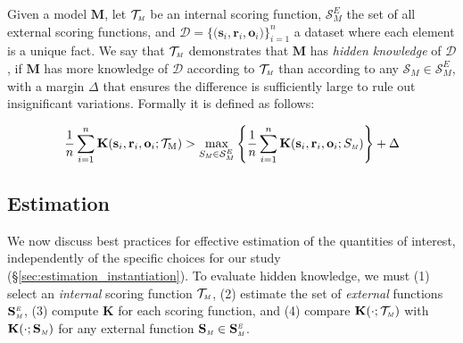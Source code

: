 \vspace{-5pt}
\begin{definition}\label{def:mistake}
\label{def:hidden_knowledge}

Given a model \( \mathbf{M} \), let \( \mathcal{T}_{\text{\tiny \emph{M}}} \) be an internal scoring function, \( \mathcal{S}_M^E \) the set of all external scoring functions, and \( \mathcal{D} = \{ \big(\mathbf{s}_i,\mathbf{r}_i,\mathbf{o}_i\big) \}_{i=1}^n \) a dataset where each element is a unique fact.
We say that \( \mathcal{T}_{\text{\tiny \emph{M}}} \) demonstrates that \( \mathbf{M} \) has \emph{hidden knowledge} of \( \mathcal{D} \), if \( \mathbf{M} \) has more knowledge of \( \mathcal{D} \) according to \( \mathcal{T}_{\text{\tiny \emph{M}}} \) than according to any \( \mathcal{S}_M \in \mathcal{S}_M^E \), with a margin \( \Delta \) that ensures the difference is sufficiently large to rule out insignificant variations. Formally it is defined as follows:



\vspace{-5pt}
\begin{equation}
\frac{1}{n} \sum_{i=1}^n \mathbf{K}(\mathbf{s}_i, \mathbf{r}_i, \mathbf{o}_i; \mathcal{T}_{\text{M}}) >
\max_{S_{\text{\tiny \emph{M}}} \in \mathcal{S}_M^E} \left\{
    \frac{1}{n} \sum_{i=1}^n \mathbf{K}(\mathbf{s}_i, \mathbf{r}_i, \mathbf{o}_i; S_{\text{\tiny \emph{M}}})
\right\} + \Delta
\label{eq:hidden_knowledge}
\end{equation}

\end{definition}


\vspace{-20pt}
\subsection{Estimation}
\label{sec:estimation}

We now discuss best practices for effective estimation of the quantities of interest, independently of the specific choices for our study (\S \ref{sec:estimation_instantiation}). 
To evaluate hidden knowledge, we must (1) select an \textit{internal} scoring function $\mathcal{T}_{\text{\tiny \emph{M}}}$, (2) estimate the set of \textit{external} functions $\mathbf{S_{\text{\tiny \emph{M}}}^{\text{\tiny \emph{E}}}}$, (3) compute $\mathbf{K}$ for each scoring function, and (4) compare $\mathbf{K(\cdot;\mathcal{T}_{\text{\tiny \emph{M}}}})$ with $\mathbf{K(\cdot;S_{\text{\tiny \emph{M}}}})$ for any external function  $\mathbf{S}_{\text{\tiny \emph{M}}} \in \mathbf{S_{\text{\tiny \emph{M}}}^{\text{\tiny \emph{E}}}}$.



